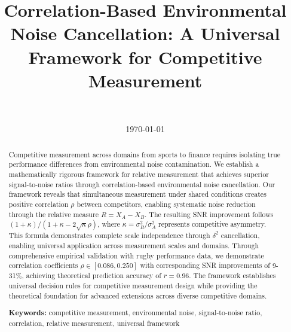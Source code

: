 \documentclass[11pt,a4paper]{article}
\title{Correlation-Based Environmental Noise Cancellation: A Universal Framework for Competitive Measurement}
\author{
    \authorone \\
    \textit{\affiliationone}
}
\date{\today}
\begin{document}
\maketitle

\begin{abstract}
Competitive measurement across domains from sports to finance requires isolating true performance differences from environmental noise contamination. We establish a mathematically rigorous framework for relative measurement that achieves superior signal-to-noise ratios through correlation-based environmental noise cancellation. Our framework reveals that simultaneous measurement under shared conditions creates positive correlation $\rho$ between competitors, enabling systematic noise reduction through the relative measure $R = X_A - X_B$. The resulting SNR improvement follows $(1 + \kappa)/(1 + \kappa - 2\sqrt{\kappa}\rho)$, where $\kappa = \sigma_B^2/\sigma_A^2$ represents competitive asymmetry. This formula demonstrates complete scale independence through $\delta^2$ cancellation, enabling universal application across measurement scales and domains. Through comprehensive empirical validation with rugby performance data, we demonstrate correlation coefficients $\rho \in [0.086, 0.250]$ with corresponding SNR improvements of 9-31\%, achieving theoretical prediction accuracy of $r = 0.96$. The framework establishes universal decision rules for competitive measurement design while providing the theoretical foundation for advanced extensions across diverse competitive domains.

\textbf{Keywords:} competitive measurement, environmental noise, signal-to-noise ratio, correlation, relative measurement, universal framework
\end{abstract}













\end{document}
